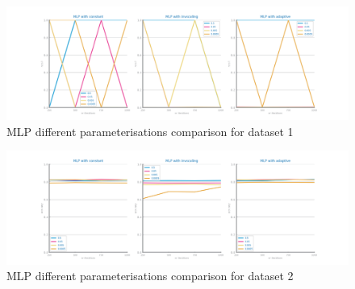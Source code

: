 \documentclass[10pt]{extarticle}
\begin{document}
\begin{figure}[H]
\centering\includegraphics[scale=0.6]{images/dataset1/models_evaluation/CovidPos_mlp_recall_study.png}
\caption{MLP different parameterisations comparison for dataset 1}
\end{figure}

\begin{figure}[H]
\centering\includegraphics[scale=0.6]{images/dataset2/models_evaluation/Credit_Score_mlp_accuracy_study.png}
\caption{MLP different parameterisations comparison for dataset 2}
\end{figure}
\end{document}
